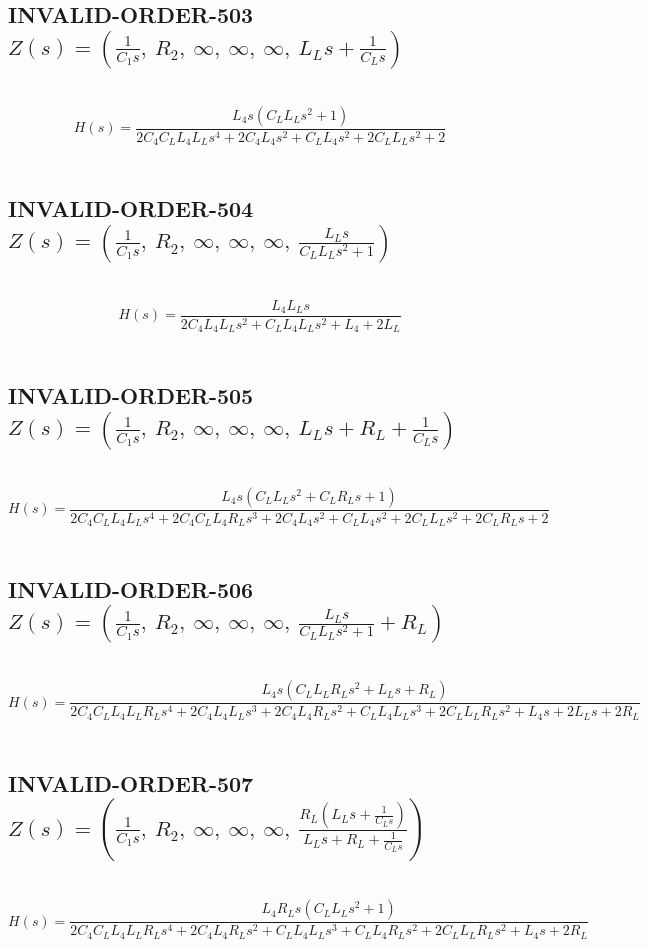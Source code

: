 \documentclass{article}
\begin{document}
\subsection{INVALID-ORDER-503 $Z(s) = \left( \frac{1}{C_{1} s}, \  R_{2}, \  \infty, \  \infty, \  \infty, \  L_{L} s + \frac{1}{C_{L} s}\right)$ } \ 
\textbf{\[H(s) = \frac{L_{4} s \left(C_{L} L_{L} s^{2} + 1\right)}{2 C_{4} C_{L} L_{4} L_{L} s^{4} + 2 C_{4} L_{4} s^{2} + C_{L} L_{4} s^{2} + 2 C_{L} L_{L} s^{2} + 2}\] } \ 
\subsection{INVALID-ORDER-504 $Z(s) = \left( \frac{1}{C_{1} s}, \  R_{2}, \  \infty, \  \infty, \  \infty, \  \frac{L_{L} s}{C_{L} L_{L} s^{2} + 1}\right)$ } \ 
\textbf{\[H(s) = \frac{L_{4} L_{L} s}{2 C_{4} L_{4} L_{L} s^{2} + C_{L} L_{4} L_{L} s^{2} + L_{4} + 2 L_{L}}\] } \ 
\subsection{INVALID-ORDER-505 $Z(s) = \left( \frac{1}{C_{1} s}, \  R_{2}, \  \infty, \  \infty, \  \infty, \  L_{L} s + R_{L} + \frac{1}{C_{L} s}\right)$ } \ 
\textbf{\[H(s) = \frac{L_{4} s \left(C_{L} L_{L} s^{2} + C_{L} R_{L} s + 1\right)}{2 C_{4} C_{L} L_{4} L_{L} s^{4} + 2 C_{4} C_{L} L_{4} R_{L} s^{3} + 2 C_{4} L_{4} s^{2} + C_{L} L_{4} s^{2} + 2 C_{L} L_{L} s^{2} + 2 C_{L} R_{L} s + 2}\] } \ 
\subsection{INVALID-ORDER-506 $Z(s) = \left( \frac{1}{C_{1} s}, \  R_{2}, \  \infty, \  \infty, \  \infty, \  \frac{L_{L} s}{C_{L} L_{L} s^{2} + 1} + R_{L}\right)$ } \ 
\textbf{\[H(s) = \frac{L_{4} s \left(C_{L} L_{L} R_{L} s^{2} + L_{L} s + R_{L}\right)}{2 C_{4} C_{L} L_{4} L_{L} R_{L} s^{4} + 2 C_{4} L_{4} L_{L} s^{3} + 2 C_{4} L_{4} R_{L} s^{2} + C_{L} L_{4} L_{L} s^{3} + 2 C_{L} L_{L} R_{L} s^{2} + L_{4} s + 2 L_{L} s + 2 R_{L}}\] } \ 
\subsection{INVALID-ORDER-507 $Z(s) = \left( \frac{1}{C_{1} s}, \  R_{2}, \  \infty, \  \infty, \  \infty, \  \frac{R_{L} \left(L_{L} s + \frac{1}{C_{L} s}\right)}{L_{L} s + R_{L} + \frac{1}{C_{L} s}}\right)$ } \ 
\textbf{\[H(s) = \frac{L_{4} R_{L} s \left(C_{L} L_{L} s^{2} + 1\right)}{2 C_{4} C_{L} L_{4} L_{L} R_{L} s^{4} + 2 C_{4} L_{4} R_{L} s^{2} + C_{L} L_{4} L_{L} s^{3} + C_{L} L_{4} R_{L} s^{2} + 2 C_{L} L_{L} R_{L} s^{2} + L_{4} s + 2 R_{L}}\] } \ 
\end{document}
